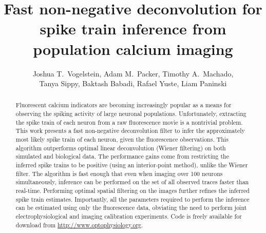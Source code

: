 %  
 
\usepackage{multicol}
\usepackage{hyperref}
\usepackage{algorithmic}
\usepackage{algorithm}
\newcommand{\zzz}{z}
\newcommand{\az}{\argmax_{\mb{M} \mb{C} \geq_\odot \ve{0}}}
\newcommand{\anx}{\argmax_{n_t \in \mathbb{N}_0 \forall t}}
\newcommand{\foopsi}{fast }


\title{Fast non-negative deconvolution for spike train inference from population calcium imaging}

\author{Joshua T.~Vogelstein, Adam M.~Packer, Timothy A.~Machado, \\ Tanya Sippy, Baktash Babadi, Rafael Yuste, Liam Paninski}



\maketitle
\begin{abstract}
Fluorescent calcium indicators are becoming increasingly popular as a means for observing the spiking activity of large neuronal populations. Unfortunately, extracting the spike train of each neuron from a raw fluorescence movie is a nontrivial problem.  This work presents a fast non-negative deconvolution filter to infer the approximately most likely spike train of each neuron, given the fluorescence observations. This algorithm outperforms optimal linear deconvolution (Wiener filtering) on both simulated and biological data. The performance gains come from restricting the inferred spike trains to be positive (using an interior-point method), unlike the Wiener filter.  The algorithm is fast enough that even when imaging over 100 neurons simultaneously, inference can be performed on the set of all observed traces faster than real-time.  Performing optimal spatial filtering on the images further refines the inferred spike train estimates.  Importantly, all the parameters required to perform the inference can be estimated using only the fluorescence data, obviating the need to perform joint electrophysiological and imaging calibration experiments. Code is freely available for download from \url{http://www.optophysiology.org}. 
\end{abstract}



